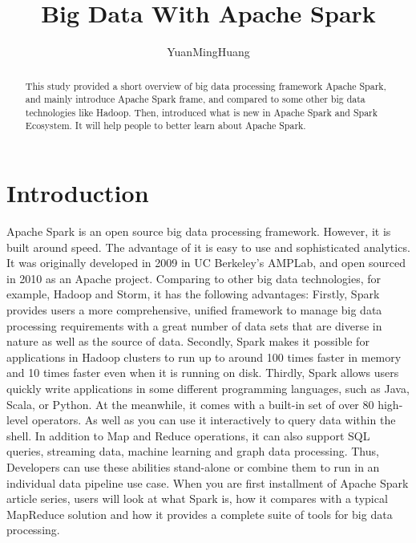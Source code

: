 \documentclass[sigconf]{acmart}
\begin{document}
\title{Big Data With Apache Spark}


\author{YuanMingHuang}


\renewcommand{\shortauthors}{H. Huang}


\begin{abstract}
This study provided a short overview of big data processing framework Apache Spark, and mainly introduce Apache Spark frame, and compared to some other big data technologies like Hadoop. Then, introduced what is new in Apache Spark and Spark Ecosystem. It will help people to better learn about Apache Spark.
\end{abstract}



\maketitle



\section{Introduction}

Apache Spark is an open source big data processing framework. However, it is built around speed. The advantage of it is easy to use and sophisticated analytics\cite{SHYAMR2015171,}. It was originally developed in 2009 in UC Berkeley’s AMPLab, and open sourced in 2010 as an Apache project. Comparing to other big data technologies, for example, Hadoop and Storm, it has the following advantages:
Firstly, Spark provides users a more comprehensive, unified framework to manage big data processing requirements with a great number of data sets that are diverse in nature as well as the source of data. 
Secondly, Spark makes it possible for applications in Hadoop clusters to run up to around 100 times faster in memory and 10 times faster even when it is running on disk.
Thirdly, Spark allows users quickly write applications in some different programming languages, such as Java, Scala, or Python. At the meanwhile, it comes with a built-in set of over 80 high-level operators. As well as you can use it interactively to query data within the shell.
In addition to Map and Reduce operations, it can also support SQL queries, streaming data, machine learning and graph data processing. Thus, Developers can use these abilities stand-alone or combine them to run in an individual data pipeline use case.
When you are first installment of Apache Spark article series, users will look at what Spark is, how it compares with a typical MapReduce solution and how it provides a complete suite of tools for big data processing.
\end{document}
